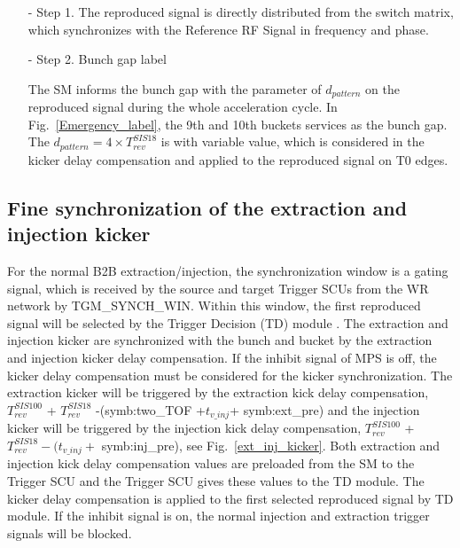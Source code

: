 \begin{itemize}
\begin{itemize}
\item[-] Step 1. The reproduced signal is directly distributed from the switch matrix, which synchronizes with the Reference RF Signal in frequency and phase.
\item[-] Step 2. Bunch gap label

The SM informs the bunch gap with the parameter of $d_{pattern}$ on the reproduced signal during the whole acceleration cycle. In Fig.~\ref{Emergency_label}, the 9th and 10th buckets services as the bunch gap. The $d_{pattern}=4\times T_{rev}^{SIS18}$ is with variable value, which is considered in the kicker delay compensation and applied to the reproduced signal on T0 edges.

\end{itemize}

\end{itemize}

\subsection{Fine synchronization of the extraction and injection kicker}
For the normal B2B extraction/injection, the synchronization window is a gating signal, which is received by the source and target Trigger SCUs from the WR network by TGM\_SYNCH\_WIN. Within this window, the first reproduced signal will be selected by the Trigger Decision (\gls{TD}) module . The extraction and injection kicker are synchronized with the bunch and bucket by the extraction and injection kicker delay compensation. If the inhibit signal of MPS is off, the kicker delay compensation must be considered for the kicker synchronization. The extraction kicker will be triggered by the extraction kick delay compensation, $T_{rev}^{SIS100}$ + $T_{rev}^{SIS18}$ -(\gls{symb:two_TOF} +$ t_{v\_inj}$+ \gls{symb:ext_pre}) and the injection kicker will be triggered by the injection kick delay compensation, $T_{rev}^{SIS100}$ + $T_{rev}^{SIS18} - (t_{v\_inj}+$ \gls{symb:inj_pre}), see Fig.~\ref{ext_inj_kicker}. Both extraction and injection kick delay compensation values are preloaded from the SM to the Trigger SCU and the Trigger SCU gives these values to the TD module. The kicker delay compensation is applied to the first selected reproduced signal by TD module. If the inhibit signal is on, the normal injection and extraction trigger signals will be blocked.

